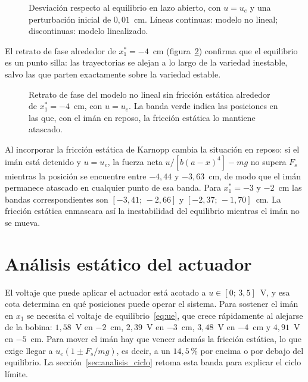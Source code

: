 \begin{figure}[ht]
    \centering
    
    \caption[Lazo abierto en los puntos de equilibrio]{Desviación respecto al equilibrio en lazo abierto, con $u=u_e$ y una perturbación inicial de $0{,}01$~cm. Líneas continuas: modelo no lineal; discontinuas: modelo linealizado.}
    \label{fig:p8_lazo_abierto}
\end{figure}

El retrato de fase alrededor de $x_1^*=-4$~cm (figura~\ref{fig:p8_retrato}) confirma que el equilibrio es un punto silla: las trayectorias se alejan a lo largo de la variedad inestable, salvo las que parten exactamente sobre la variedad estable.


\begin{figure}[ht]
    \centering
    
    \caption[Retrato de fase en lazo abierto]{Retrato de fase del modelo no lineal sin fricción estática alrededor de $x_1^*=-4$~cm, con $u=u_e$. La banda verde indica las posiciones en las que, con el imán en reposo, la fricción estática lo mantiene atascado.}
    \label{fig:p8_retrato}
\end{figure}

Al incorporar la fricción estática de Karnopp cambia la situación en reposo: si el imán está detenido y $u=u_e$, la fuerza neta $u/[b(a-x)^4]-mg$ no supera $F_s$ mientras la posición se encuentre entre $-4{,}44$ y $-3{,}63$~cm, de modo que el imán permanece atascado en cualquier punto de esa banda. Para $x_1^*=-3$ y $-2$~cm las bandas correspondientes son $[-3{,}41;\,-2{,}66]$ y $[-2{,}37;\,-1{,}70]$~cm. La fricción estática enmascara así la inestabilidad del equilibrio mientras el imán no se mueva.

\FloatBarrier

\section{Análisis estático del actuador}\label{sec:actuador_estatico}

El voltaje que puede aplicar el actuador está acotado a $u\in[0;\,3{,}5]$~V, y esa cota determina en qué posiciones puede operar el sistema. Para sostener el imán en $x_1$ se necesita el voltaje de equilibrio~\eqref{eq:ue}, que crece rápidamente al alejarse de la bobina: $1{,}58$~V en $-2$~cm, $2{,}39$~V en $-3$~cm, $3{,}48$~V en $-4$~cm y $4{,}91$~V en $-5$~cm. Para mover el imán hay que vencer además la fricción estática, lo que exige llegar a $u_e(1\pm F_s/mg)$, es decir, a un $14{,}5$\,\% por encima o por debajo del equilibrio. La sección~\ref{sec:analisis_ciclo} retoma esta banda para explicar el ciclo límite.

